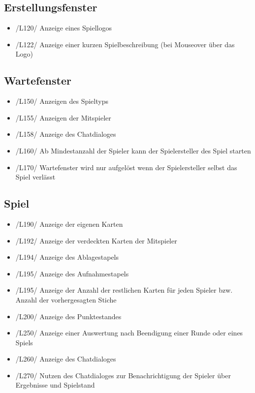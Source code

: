 \documentclass{article}
\begin{document}
\subsection{Erstellungsfenster}
\begin{itemize}
	\item /L120/ Anzeige eines Spiellogos
	\item /L122/ Anzeige einer kurzen Spielbeschreibung (bei Mouseover über das Logo)
\end{itemize}

\subsection{Wartefenster}
\begin{itemize}
	\item /L150/ Anzeigen des Spieltyps
	\item /L155/ Anzeigen der Mitspieler
	\item /L158/ Anzeige des Chatdialoges
	\item /L160/ Ab Mindestanzahl der Spieler kann der Spielersteller des Spiel starten
	\item /L170/ \gls{Wartefenster} wird nur aufgelöst wenn der Spielersteller selbst das Spiel verlässt
\end{itemize}

\subsection{Spiel}
\begin{itemize}
	\item /L190/ Anzeige der eigenen Karten
	\item /L192/ Anzeige der verdeckten Karten der Mitspieler
	\item /L194/ Anzeige des Ablagestapels
	\item /L195/ Anzeige des Aufnahmestapels
	\item /L195/ Anzeige der Anzahl der restlichen Karten für jeden Spieler bzw. Anzahl der vorhergesagten Stiche
	\item /L200/ Anzeige des Punktestandes
	\item /L250/ Anzeige einer Auswertung nach Beendigung einer Runde oder eines Spiels
	\item /L260/ Anzeige des Chatdialoges
	\item /L270/ Nutzen des Chatdialoges zur Benachrichtigung der Spieler über Ergebnisse und Spielstand
\end{itemize}
	
\end{document}
